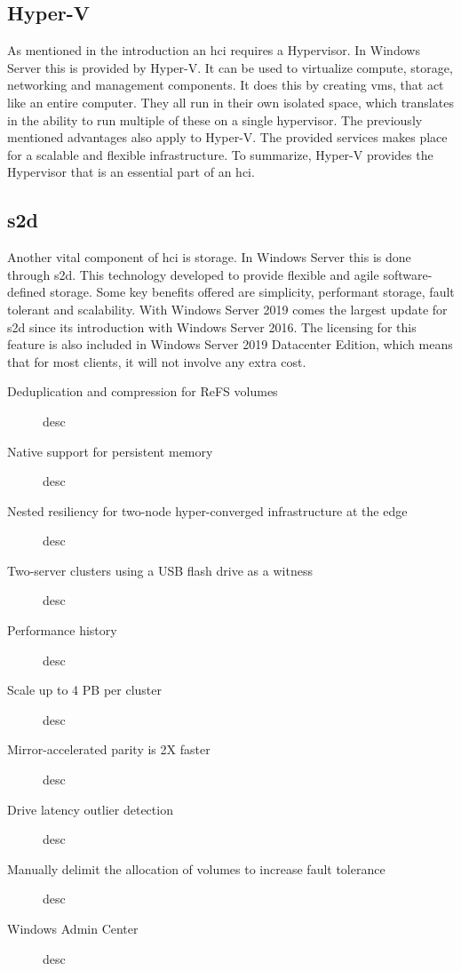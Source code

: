 \subsection{Hyper-V}
As mentioned in the introduction an \acrfull{hci} requires a Hypervisor. In Windows Server this is provided by Hyper-V. It can be used to virtualize compute, storage, networking and management components.  It does this by creating \acrshort{vm}s, that act like an entire computer. They all run in their own isolated space, which translates in the ability to run multiple of these on a single hypervisor. The previously mentioned advantages also apply to Hyper-V. The provided services makes place for a scalable and flexible infrastructure. To summarize, Hyper-V provides the Hypervisor that is an essential part of an \acrshort{hci}. \autocite{Short2016}
\subsection{\acrfull{s2d}}
Another vital component of \acrshort{hci} is storage. In Windows Server this is done through \acrshort{s2d}. This technology developed to provide flexible and agile software-defined storage. Some key benefits offered are simplicity, performant storage, fault tolerant and scalability. With Windows Server 2019 comes the largest update for \acrshort{s2d} since its introduction with Windows Server 2016. The licensing for this feature is also included in Windows Server 2019 Datacenter Edition, which means that for most clients, it will not involve any extra cost. \autocite{Gerend2018a}
\begin{description}
	\item [Deduplication and compression for ReFS volumes] desc
	\item [Native support for persistent memory] desc
	\item [Nested resiliency for two-node hyper-converged infrastructure at the edge] desc
	\item [Two-server clusters using a USB flash drive as a witness] desc
	\item [Performance history] desc
	\item [Scale up to 4 PB per cluster] desc
	\item [Mirror-accelerated parity is 2X faster] desc
	\item [Drive latency outlier detection] desc
	\item [Manually delimit the allocation of volumes to increase fault tolerance] desc
	\item [Windows Admin Center] desc
\end{description}
